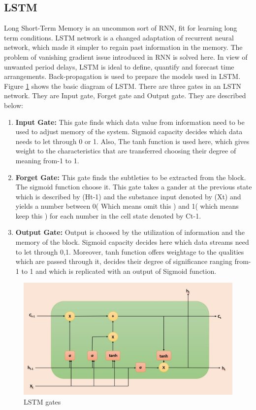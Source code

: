 \subsection{LSTM}
Long Short-Term Memory is an uncommon sort of RNN, fit for learning long term conditions. LSTM network is a changed adaptation of recurrent neural network, which made it simpler to regain past information in the memory. The problem of vanishing gradient issue introduced in RNN is solved here. In view of unwanted period delays, LSTM is ideal to define, quantify and forecast time arrangements. Back-propagation is used to prepare the models used in LSTM. Figure \ref{fig:lstm} shows the basic diagram of LSTM. There are three gates in an LSTN network. They are Input gate, Forget gate and Output gate. They are described below: 
 \begin{enumerate}
     \item \textbf{Input Gate: } This gate finds which data value from information need to be used to adjust memory of the system. Sigmoid capacity decides which data needs  to let through 0 or 1. Also, The tanh function is used here, which gives weight to the characteristics that are transferred choosing their degree of meaning from-1 to 1.
     
     \item \textbf{Forget Gate: } This gate finds the subtleties to be extracted from the block. The sigmoid function choose it. This gate takes a gander at the previous state which is described by (Ht-1) and the substance input denoted by (Xt) and yields a number between 0( Which means omit this ) and 1( which means keep this ) for each number in the cell state denoted by Ct-1.
     
     \item\textbf{Output Gate: } Output is choosed by the utilization of information and the memory of the block. Sigmoid capacity decides here which data streams need to let through 0,1. Moreover, tanh function offers weightage to the qualities which are passed through it, decides their degree of significance ranging from-1 to 1 and which is replicated with an output of Sigmoid function.
 \end{enumerate}
  \begin{figure}[ht]
    \centering
    \includegraphics[scale=0.4]{Chap3/LSTN.JPG}
    \caption{LSTM gates}
    \label{fig:lstm}
\end{figure}
